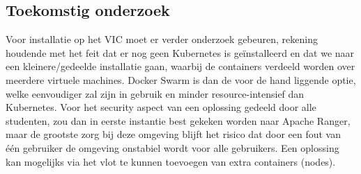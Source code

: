 \documentclass[a0,portrait]{hogent-poster}
\begin{document}
\begin{multicols}{2}
\section{Toekomstig onderzoek}
Voor installatie op het VIC moet er verder onderzoek gebeuren, rekening houdende met het feit dat er nog geen Kubernetes is geïnstalleerd en dat we naar een kleinere/gedeelde installatie gaan, waarbij de containers verdeeld worden over meerdere virtuele machines. Docker Swarm is dan de voor de hand liggende optie, welke eenvoudiger zal zijn in gebruik en minder resource-intensief dan Kubernetes.
\newline
\newline
Voor het security aspect van een oplossing gedeeld door alle studenten, zou dan in eerste instantie best gekeken worden naar Apache Ranger, maar de grootste zorg bij deze omgeving blijft het risico dat door een fout van \'e\'en gebruiker de omgeving onstabiel wordt voor alle gebruikers. Een oplossing kan mogelijks via het vlot te kunnen toevoegen van extra containers (nodes).


\end{multicols}
\end{document}
